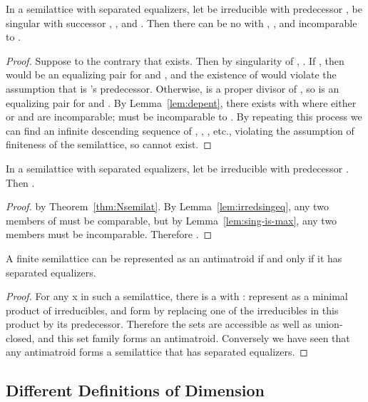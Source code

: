 \documentclass[11pt]{llncs}
\begin{document}
{\begin{lemma}
\label{lem:irredsingeq}
In a semilattice with separated equalizers, let  be irreducible with predecessor ,
 be singular with successor , , and . Then there can be no  with , , and  incomparable to .
\end{lemma}

\begin{proof}
Suppose to the contrary that  exists.
Then by singularity of , . If , then  would be an equalizing pair for  and , and the existence of  would violate the assumption that  is 's predecessor.
Otherwise,  is a proper divisor of , so  is an equalizing pair for  and .
By Lemma~\ref{lem:depent}, there exists  with  where either  or   and  are incomparable;   must be incomparable to .
By repeating this process we can find an infinite descending sequence of , , , etc., violating the assumption of finiteness of the semilattice, so  cannot exist.
\end{proof}

\begin{lemma}
\label{lem:irred-single}
In a semilattice with separated equalizers, let  be irreducible with predecessor .
Then .
\end{lemma}

\begin{proof}
 by Theorem~\ref{thm:Nsemilat}.
By Lemma~\ref{lem:irredsingeq}, any two members of  must be comparable, but by Lemma~\ref{lem:sing-is-max}, any two members must be incomparable.
Therefore .
\end{proof}
 
\begin{theorem}
A finite semilattice can be represented as an antimatroid if and only if it has separated equalizers.
\end{theorem}

\begin{proof}
For any x in such a semilattice, there is a  with : represent  as a minimal product of irreducibles, and form  by replacing one of the irreducibles in this product by its predecessor. Therefore the sets  are accessible as well as union-closed, and this set family forms an antimatroid. Conversely we have seen that any antimatroid forms a semilattice that has separated equalizers.
\end{proof}

\subsection{Different Definitions of Dimension}

}
\end{document}
